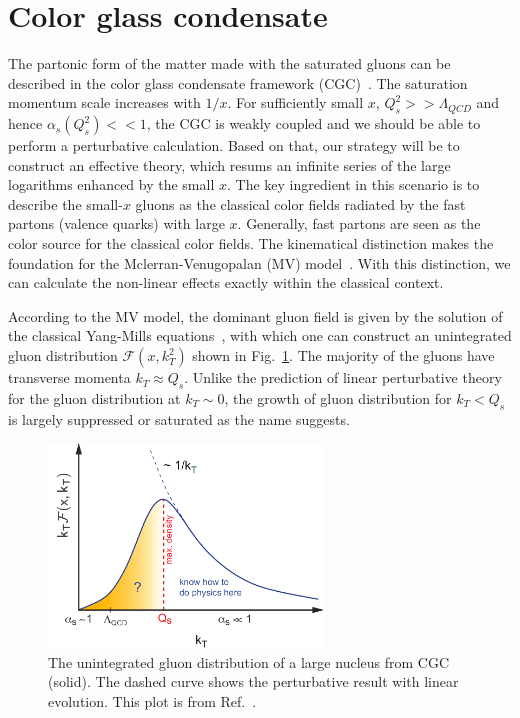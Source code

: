 \section{Color glass condensate}\label{sec:CGC}
The partonic form of the matter made with the saturated gluons can be described in the color glass condensate framework (CGC)~\cite{Iancu:2002xk}. The saturation momentum scale
increases with $1/x$. For sufficiently small $x$, $Q^{2}_{s}>>\Lambda_{QCD}$ and
hence $\alpha_{s}(Q^{2}_{s})<<1$, the CGC is weakly coupled and we should be
able to perform a perturbative calculation. Based on that, our strategy will be
to construct an effective theory, which resums an infinite series of the large
logarithms enhanced by the small $x$. The key ingredient in this scenario is to
describe the small-$x$ gluons as the classical color fields radiated by the fast
partons (valence quarks) with large $x$. Generally, fast partons are seen as the
color source for the classical color fields. The kinematical distinction makes
the foundation for the Mclerran-Venugopalan (MV) model~\cite{McLerran:1993ni}.
With this distinction, we can calculate the non-linear effects exactly within
the classical context.

According to the MV model, the dominant gluon field is given by the solution of
the classical Yang-Mills equations~\cite{Kovchegov:1996ty}, with
which one can construct an unintegrated gluon distribution $\mathcal{F}(x,k^{2}_{T})$
shown in Fig.~\ref{fig:gluon_TMD}. The majority of the gluons have transverse
momenta $k_{T}\approx Q_{s}$. Unlike the prediction of linear perturbative
theory for the gluon distribution at $k_{T}\sim0$, the growth of gluon distribution
for $k_{T}<Q_{s}$ is largely suppressed or saturated as the name suggests.
\begin{figure}
\centering
\includegraphics[width=0.65\textwidth]{plots/chpt3/kt_schematic.png}
\caption[Unintegrated gluon transverse momentum distribution]{
The unintegrated gluon distribution of a large nucleus from CGC (solid). The dashed curve 
shows the perturbative result with linear evolution. This plot is from Ref.~\cite{Accardi:2012qut}.}
\label{fig:gluon_TMD}
\end{figure}


